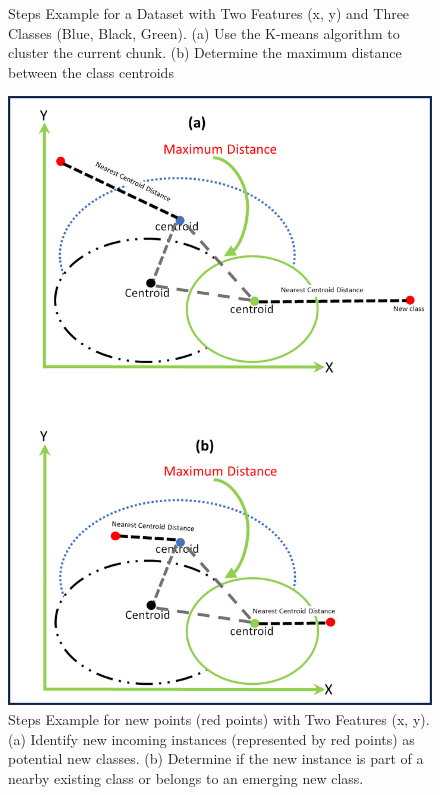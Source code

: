 \begin{figure}[!ht]
\begin{minipage}{0.48\textwidth}
        \caption{Steps Example for a Dataset with Two Features (x, y) and Three Classes (Blue, Black, Green). (a) Use the K-means algorithm to cluster the current chunk. (b) Determine the maximum distance between the class centroids}
        \label{fig:scenario1}
    \end{minipage}
    \hfill
    \begin{minipage}{0.48\textwidth}
        \centering
        \includegraphics[width=\linewidth]{5_Emerging/images/scenario2.png}
        \caption{Steps Example for new points (red points) with Two Features (x, y). (a) Identify new incoming instances (represented by red points) as potential new classes. (b) Determine if the new instance is part of a nearby existing class or belongs to an emerging new class.}
        \label{fig:scenario2}
    \end{minipage}
\end{figure}



